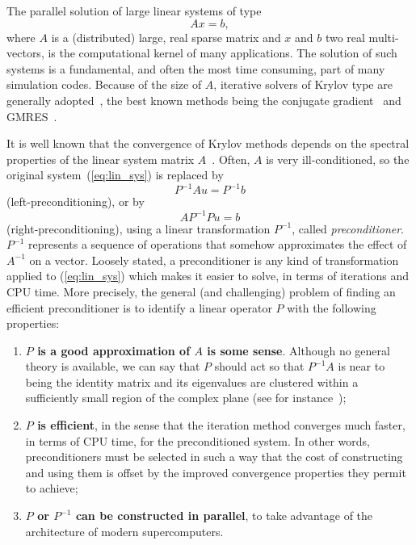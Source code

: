 \documentclass{article}[11pt]
\begin{document}
The parallel solution of large linear systems of type
\begin{equation}
\label{eq:lin_sys}
A {x} = {b},
\end{equation}
where $A$ is a (distributed) large, real sparse matrix and $x$ and $b$ two real
multi-vectors, is the computational kernel of many applications. The solution
of such systems is a fundamental, and often the most time consuming,
  part of many simulation codes. Because of
the size of $A$, iterative solvers of Krylov type are generally
adopted~\cite{barret93templates}, the
best known methods being the conjugate gradient~\cite{hestenes52method} and
GMRES~\cite{saad86gmres}.
  
It is well known that the convergence of Krylov methods depends on 
the spectral properties of the linear system matrix
$A$~\cite{axelsson94iterative,saad96iterative,QSS}. Often, $A$ is very
ill-conditioned, so the
original system~(\ref{eq:lin_sys}) is replaced by
\[
P^{-1} A{u} = P^{-1} {b}
\]
(left-preconditioning), or by
\[
A P^{-1} P {u} = {b}
\]
(right-preconditioning), using a linear transformation $P^{-1}$,
called {\sl preconditioner}. $P^{-1}$ represents a sequence of operations
that somehow approximates the effect of $A^{-1}$ on a vector. 
Loosely stated, a preconditioner is any
kind of transformation applied to (\ref{eq:lin_sys}) which makes it
easier to solve, in terms of iterations and CPU time. More precisely,
the general (and challenging) problem of finding an efficient
preconditioner is to identify a linear operator $P$ with the following
properties:
\begin{enumerate}
\item {\bf $P$ is a good approximation of $A$ is some sense}. Although no
  general theory is available, we can say that $P$ should act so that
  $P^{-1} A$ is near to being the identity matrix and its eigenvalues
  are clustered within a sufficiently small region of the complex plane 
  (see for instance~\cite{greenbaum97iterative});
\item {\bf $P$ is efficient}, in the sense that the iteration method converges
  much faster, in terms of CPU time, for the preconditioned system.  In
  other words, preconditioners must be selected in such a way that the
  cost of constructing and using them is offset by the improved
  convergence properties they permit to achieve;
\item {\bf $P$ or $P^{-1}$ can be constructed in parallel}, to take advantage of the architecture of modern supercomputers.
\end{enumerate}
\end{document}
